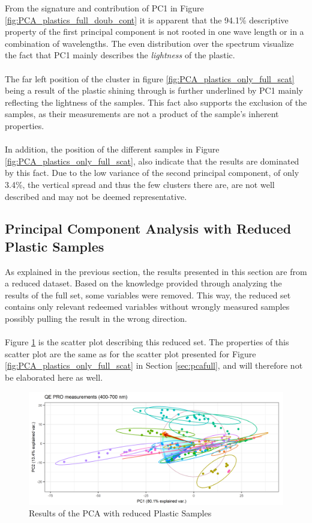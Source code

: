 \noindent
From the signature and contribution of PC1 in Figure \ref{fig:PCA_plastics_full_doub_cont} it is apparent that the 94.1\% descriptive property of the first principal component is not rooted in one wave length or in a combination of wavelengths. The even distribution over the spectrum visualize the fact that PC1 mainly describes the \textit{lightness} of the plastic.
\\\\
The far left position of the cluster in figure \ref{fig:PCA_plastics_only_full_scat} being a result of the plastic shining through is further underlined by PC1 mainly reflecting the lightness of the samples. This fact also supports the exclusion of the samples, as their measurements are not a product of the sample's inherent properties.
\\\\
In addition, the position of the different samples in Figure \ref{fig:PCA_plastics_only_full_scat}, also indicate that the results are dominated by this fact. Due to the low variance of the second principal component, of only 3.4\%, the vertical spread and thus the few clusters there are, are not well described and may not be deemed representative.

\subsection{Principal Component Analysis with Reduced Plastic Samples}
As explained in the previous section, the results presented in this section are from a reduced dataset. Based on the knowledge provided through analyzing the results of the full set, some variables were removed. This way, the reduced set contains only relevant redeemed variables without wrongly measured samples possibly pulling the result in the wrong direction. 
\\\\
Figure \ref{fig:PCA_plastics_reduced_only_scat} is the scatter plot describing this reduced set. The properties of this scatter plot are the same as for the scatter plot presented for Figure \ref{fig:PCA_plastics_only_full_scat} in Section \ref{sec:pcafull}, and will therefore not be elaborated here as well.

\begin{figure}[H]
    \centering
    \includegraphics[width=1\textwidth]{Images/results/PCA_plastics_reduced_only_scat.png}
    \caption{Results of the PCA with reduced Plastic Samples}
    \label{fig:PCA_plastics_reduced_only_scat}
\end{figure}

